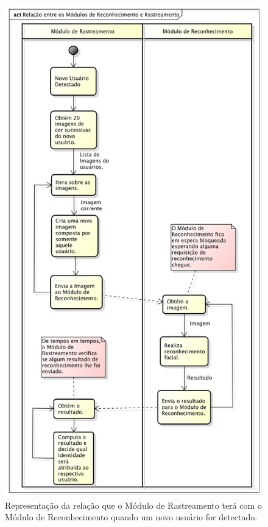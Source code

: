 		\begin{figure}[hbt]
			\begin{center}
				\includegraphics[scale=0.6]{figuras/4.ProblemaEProposta/diagrama-relacao.png}
			\end{center}
			\caption{Representação da relação que o Módulo de Rastreamento terá com o Módulo de Reconhecimento quando um novo usuário for detectado.}
			\label{fig:rastreamento-reconhecimento}
		\end{figure}
	
